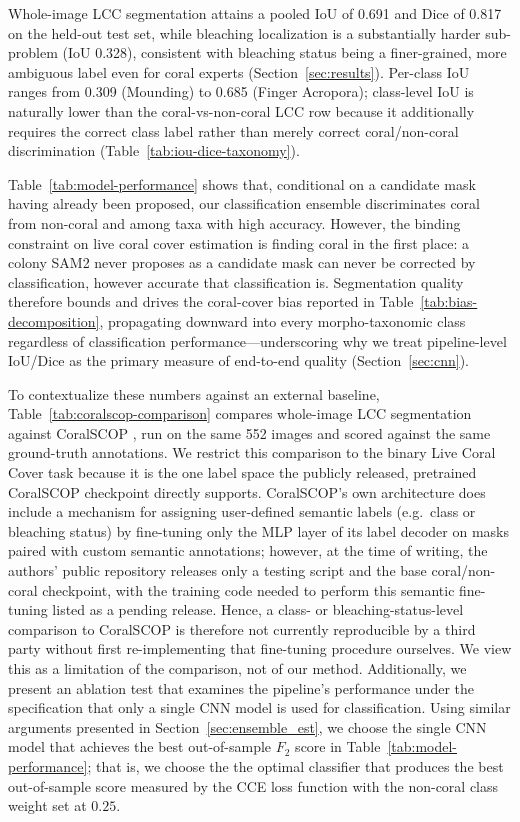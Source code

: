 \documentclass[11pt]{elsarticle}
\begin{document}
Whole-image LCC segmentation attains a pooled IoU of 0.691 and Dice of 0.817 on the held-out test set, while bleaching localization is a substantially harder sub-problem (IoU 0.328), consistent with bleaching status being a finer-grained, more ambiguous label even for coral experts (Section~\ref{sec:results}). Per-class IoU ranges from 0.309 (Mounding) to 0.685 (Finger Acropora); class-level IoU is naturally lower than the coral-vs-non-coral LCC row because it additionally requires the correct class label rather than merely correct coral/non-coral discrimination (Table~\ref{tab:iou-dice-taxonomy}).

Table~\ref{tab:model-performance} shows that, conditional on a candidate mask having already been proposed, our classification ensemble discriminates coral from non-coral and among taxa with high accuracy. However, the binding constraint on live coral cover estimation is finding coral in the first place: a colony SAM2 never proposes as a candidate mask can never be corrected by classification, however accurate that classification is. Segmentation quality therefore bounds and drives the coral-cover bias reported in Table~\ref{tab:bias-decomposition}, propagating downward into every morpho-taxonomic class regardless of classification performance---underscoring why we treat pipeline-level IoU/Dice as the primary measure of end-to-end quality (Section~\ref{sec:cnn}).

To contextualize these numbers against an external baseline, Table~\ref{tab:coralscop-comparison} compares whole-image LCC segmentation against CoralSCOP \citep{zheng2024}, run on the same 552 images and scored against the same ground-truth annotations. We restrict this comparison to the binary Live Coral Cover task because it is the one label space the publicly released, pretrained CoralSCOP checkpoint directly supports. CoralSCOP's own architecture does include a mechanism for assigning user-defined semantic labels (e.g.\ class or bleaching status) by fine-tuning only the MLP layer of its label decoder on masks paired with custom semantic annotations; however, at the time of writing, the authors' public repository releases only a testing script and the base coral/non-coral checkpoint, with the training code needed to perform this semantic fine-tuning listed as a pending release.
Hence, a class- or bleaching-status-level comparison to CoralSCOP is therefore not currently reproducible by a third party without first re-implementing that fine-tuning procedure ourselves. We view this as a limitation of the comparison, not of our method.
Additionally, we present an ablation test that examines the pipeline's performance under the specification that only a single CNN model is used for classification. Using similar arguments presented in Section~\ref{sec:ensemble_est}, we choose the single CNN model that achieves the best out-of-sample $F_2$ score in Table~\ref{tab:model-performance}; that is, we choose the
the optimal classifier that produces the best out-of-sample score measured by the CCE loss function with the non-coral class weight set at $0.25$.
\end{document}
